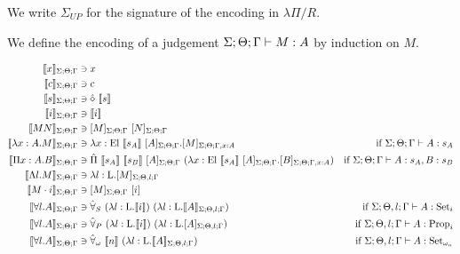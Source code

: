 \documentclass[]{StandardTemplate}
\begin{document}
We write $ \Sigma_{UP} $ for the signature of the encoding in $ \lambda \Pi / R $.


\newcommand{\pushright}[1]{\ifmeasuring@#1\else\omit\hfill$\displaystyle#1$\fi\ignorespaces}
\newcommand{\specialcell}[1]{\ifmeasuring@#1\else\omit$\displaystyle#1$\ignorespaces\fi}

We define the encoding of a judgement $ {\Sigma;\Theta;\Gamma} \vdash M : A $ by induction on $ M $.

\begin{align*}
  \llbracket x \rrbracket_{\Sigma;\Theta;\Gamma} &\ni x\\
  \llbracket c \rrbracket_{\Sigma;\Theta;\Gamma} &\ni c\\
  \llbracket s \rrbracket_{\Sigma;\Theta;\Gamma} &\ni \hat{\diamond}~\llbracket s \rrbracket\\
  \llbracket i \rrbracket_{\Sigma;\Theta;\Gamma} &\ni \llbracket i \rrbracket\\
  \llbracket M N \rrbracket_{\Sigma;\Theta;\Gamma} &\ni [M]_{\Sigma;\Theta;\Gamma}~[N]_{\Sigma;\Theta;\Gamma}\\
  \llbracket \lambda x : A. M \rrbracket_{\Sigma;\Theta;\Gamma} &\ni \lambda x : \text{El}~\llbracket s_A \rrbracket~[A]_{\Sigma;\Theta;\Gamma}. [M]_{{\Sigma;\Theta;\Gamma}, x:A} &\text{if } {\Sigma;\Theta;\Gamma} \vdash A : s_A\\
  \llbracket \Pi x : A. B \rrbracket_{\Sigma;\Theta;\Gamma} &\ni \hat{\Pi}~\llbracket s_A \rrbracket~\llbracket s_B \rrbracket~[A]_{\Sigma;\Theta;\Gamma}~(\lambda x : \text{El}~\llbracket s_A \rrbracket ~ [A]_{\Sigma;\Theta;\Gamma}. [B]_{{\Sigma;\Theta;\Gamma}, x: A})  &\text{if } {\Sigma;\Theta;\Gamma} \vdash A : s_A, B : s_B\\
  \llbracket \Lambda l. M \rrbracket_{\Sigma;\Theta;\Gamma} &\ni \lambda l : \text{L}. [M]_{\Sigma; \Theta, l; \Gamma} \\
  \llbracket M \cdot i \rrbracket_{\Sigma;\Theta;\Gamma} &\ni [M]_{\Sigma;\Theta;\Gamma}~[i]\\  
  \llbracket \forall l . A \rrbracket_{\Sigma;\Theta;\Gamma} &\ni \hat{\forall}_S~(\lambda l : \text{L}. \llbracket i \rrbracket)~(\lambda l : \text{L}. \llbracket A \rrbracket_{\Sigma; \Theta, l; \Gamma}) & \text{if } \Sigma; \Theta, l; \Gamma \vdash A : \text{Set}_i\\
  \llbracket \forall l . A \rrbracket_{\Sigma;\Theta;\Gamma} &\ni \hat{\forall}_P~(\lambda l : \text{L}. \llbracket i \rrbracket)~(\lambda l : \text{L}. [ A ]_{\Sigma; \Theta, l; \Gamma}) & \text{if } \Sigma; \Theta, l; \Gamma \vdash A : \text{Prop}_i\\
  \llbracket \forall l . A \rrbracket_{\Sigma;\Theta;\Gamma} &\ni \hat{\forall}_\omega~\llbracket n \rrbracket~(\lambda l : \text{L}. \llbracket A \rrbracket_{\Sigma; \Theta, l; \Gamma}) & \text{if } \Sigma; \Theta, l; \Gamma \vdash A : \text{Set}_{\omega_n}\\
\end{align*}
\end{document}

